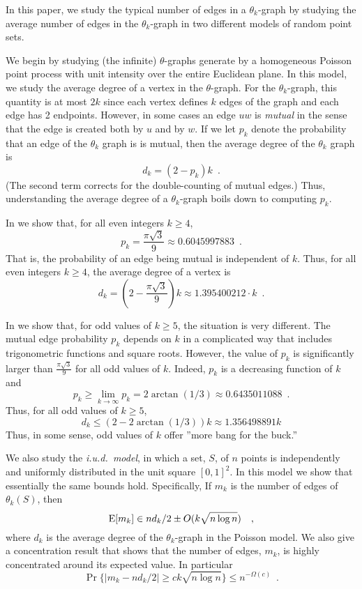 \documentclass{patmorin}
\begin{document}
In this paper, we study the typical number of edges in a $\theta_k$-graph
by studying the average number of edges in the $\theta_k$-graph in 
two different models of random point sets.

We begin by studying (the infinite) $\theta$-graphs generate by a
homogeneous Poisson point process with unit intensity over the entire
Euclidean plane.  In this model, we study the average degree of a vertex
in the $\theta$-graph.  For the $\theta_k$-graph, this quantity is at
most $2k$ since each vertex defines $k$ edges of the graph and each edge
has 2 endpoints.  However, in some cases an edge $uw$ is \emph{mutual}
in the sense that the edge is created both by $u$ and by $w$.  If we
let $p_k$ denote the probability that an edge of the $\theta_k$ graph
is is mutual, then the average degree of the $\theta_k$ graph is
\[
    d_k = (2-p_k)k \enspace .
\]
(The second term corrects for the double-counting of mutual edges.)  Thus,
understanding the average degree of a $\theta_k$-graph boils down to
computing $p_k$.

In  we show that, for all even integers $k\ge 4$,
\[
    p_k=\frac{\pi\sqrt{3}}{9}\approx 0.6045997883 \enspace .
\]
That is, the probability of an edge being mutual is independent of
$k$. Thus, for all even integers $k\ge 4$, the average degree of a
vertex is
\[
  d_k = \left(2-\frac{\pi\sqrt{3}}{9}\right)k \approx 1.395400212\cdot k \enspace .
\]

In  we show that, for odd values of $k\ge 5$, the situation
is very different.  The mutual edge probability $p_k$ depends on
$k$ in a complicated way that includes trigonometric functions and
square roots.  However, the value of $p_k$ is significantly larger than
$\frac{\pi\sqrt{3}}{9}$ for all odd values of $k$.  Indeed, $p_k$ is a
decreasing function of $k$ and
\[
  p_k\ge \lim_{k\to\infty} p_k = 2\arctan(1/3)\approx 0.6435011088 \enspace .
\]
Thus, for all odd values of $k\ge 5$,
\[
   d_k \le (2-2\arctan(1/3))k \approx 1.356498891 k
\]
Thus, in some sense, odd values of $k$ offer ''more bang for the buck.''

We also study the \emph{i.u.d.\ model}, in which a set, $S$, of $n$
points is independently and uniformly distributed in the unit square
$[0,1]^2$.  In this model we show that essentially the same bounds hold.
Specifically, If $m_k$ is the number of edges of $\theta_k(S)$, then 
\[
    \mathrm{E}[m_k] \in nd_k/2\pm O(k\sqrt{n\log n}) \enspace \enspace ,
\]
where $d_k$ is the average degree of the $\theta_k$-graph in the
Poisson model.  We also give a concentration result that shows that the
number of edges, $m_k$, is highly concentrated around its expected value.
In particular
\[
    \Pr\{|m_k - nd_k/2| \ge ck\sqrt{n\log n}\} \le n^{-\Omega(c)} \enspace .
\]
\end{document}
